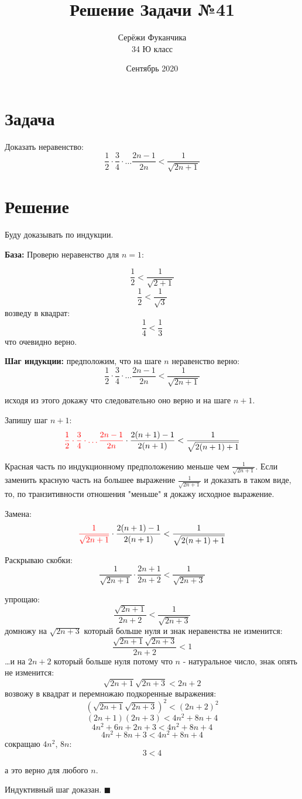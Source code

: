 \documentclass{article}
\title{Решение Задачи №41}
\author{Серёжи Фуканчика\\34 Ю класс}
\date{Сентябрь 2020}
\begin{document}
\maketitle

\section{Задача}
Доказать неравенство:
$$
\frac{1}{2}\cdot\frac{3}{4}\cdot\ldots\frac{2n-1}{2n} < \frac{1}{\sqrt{2n+1}}
$$

\section{Решение}
Буду доказывать по индукции.

\textbf{База:} Проверю неравенство для $n=1$:

$$\frac{1}{2} < \frac{1}{\sqrt{2+1}}$$
$$\frac{1}{2} < \frac{1}{\sqrt{3}}$$
возведу в квадрат:
$$\frac{1}{4} < \frac{1}{3}$$
что очевидно верно.

\textbf{Шаг индукции:} предположим, что на шаге $n$ неравенство верно:
$$
\frac{1}{2}\cdot\frac{3}{4}\cdot\ldots\frac{2n-1}{2n} < \frac{1}{\sqrt{2n+1}}
$$

исходя из этого докажу что следовательно оно верно и на шаге $n+1$.

Запишу шаг $n+1$:
$$
{ \color{red}\frac{1}{2}\cdot\frac{3}{4}\cdot\ldots\frac{2n-1}{2n} }\cdot\frac{2(n+1)-1}{2(n+1)} < \frac{1}{\sqrt{2(n+1)+1}}
$$

Красная часть по индукционному предположению меньше чем $\frac{1}{\sqrt{2n+1}}$. Если заменить красную часть на большее выражение $\frac{1}{\sqrt{2n+1}}$ и доказать в таком виде, то, по транзитивности отношения "меньше" я докажу исходное выражение.

Замена:
$$
{ \color{red}\frac{1}{\sqrt{2n+1}} }\cdot\frac{2(n+1)-1}{2(n+1)} < \frac{1}{\sqrt{2(n+1)+1}}
$$

Раскрываю скобки:
$$
\frac{1}{\sqrt{2n+1}}
\cdot\frac{2n+1}{2n+2} < \frac{1}{\sqrt{2n+3}}
$$

упрощаю:
$$
\frac{\sqrt{2n+1}}{2n+2} < \frac{1}{\sqrt{2n+3}}
$$
домножу на $\sqrt{2n+3}$ который больше нуля и знак неравенства не изменится:
$$
\frac{\sqrt{2n+1}\sqrt{2n+3}}{2n+2} < 1
$$
\ldots{}и на $2n+2$ который больше нуля потому что $n$ - натуральное число, знак опять не изменится:
$$
\sqrt{2n+1}\sqrt{2n+3} < 2n+2
$$
возвожу в квадрат и перемножаю подкоренные выражения:
$$
(\sqrt{2n+1}\sqrt{2n+3})^2 < (2n+2)^2
$$
$$
(2n+1)(2n+3) < 4n^2+8n+4
$$
$$
4n^2+6n+2n+3 < 4n^2+8n+4
$$
$$
4n^2+8n+3 < 4n^2+8n+4
$$
сокращаю $4n^2$, $8n$:
$$
3 < 4
$$

а это верно для любого $n$.

Индуктивный шаг доказан. $\blacksquare$
\end{document}
